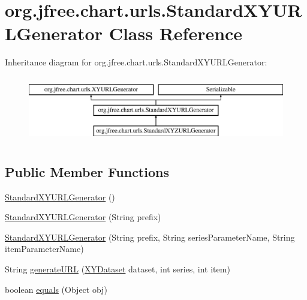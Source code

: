 \hypertarget{classorg_1_1jfree_1_1chart_1_1urls_1_1_standard_x_y_u_r_l_generator}{}\section{org.\+jfree.\+chart.\+urls.\+Standard\+X\+Y\+U\+R\+L\+Generator Class Reference}
\label{classorg_1_1jfree_1_1chart_1_1urls_1_1_standard_x_y_u_r_l_generator}
Inheritance diagram for org.\+jfree.\+chart.\+urls.\+Standard\+X\+Y\+U\+R\+L\+Generator\+:\begin{figure}[H]
\begin{center}
\leavevmode
\includegraphics[height=2.906574cm]{classorg_1_1jfree_1_1chart_1_1urls_1_1_standard_x_y_u_r_l_generator}
\end{center}
\end{figure}
\subsection*{Public Member Functions}
\begin{DoxyCompactItemize}
\item 
\mbox{\hyperlink{classorg_1_1jfree_1_1chart_1_1urls_1_1_standard_x_y_u_r_l_generator_a425eb3dcb8d8391f50638ed1cb5edd79}{Standard\+X\+Y\+U\+R\+L\+Generator}} ()
\item 
\mbox{\hyperlink{classorg_1_1jfree_1_1chart_1_1urls_1_1_standard_x_y_u_r_l_generator_a8dfdae933d8c44f59e55aeaeb650091f}{Standard\+X\+Y\+U\+R\+L\+Generator}} (String prefix)
\item 
\mbox{\hyperlink{classorg_1_1jfree_1_1chart_1_1urls_1_1_standard_x_y_u_r_l_generator_aabfc47d4adf05c373063da6091a90274}{Standard\+X\+Y\+U\+R\+L\+Generator}} (String prefix, String series\+Parameter\+Name, String item\+Parameter\+Name)
\item 
String \mbox{\hyperlink{classorg_1_1jfree_1_1chart_1_1urls_1_1_standard_x_y_u_r_l_generator_afdbbde5516c0cdc59116103b1f4ad62d}{generate\+U\+RL}} (\mbox{\hyperlink{interfaceorg_1_1jfree_1_1data_1_1xy_1_1_x_y_dataset}{X\+Y\+Dataset}} dataset, int series, int item)
\item 
boolean \mbox{\hyperlink{classorg_1_1jfree_1_1chart_1_1urls_1_1_standard_x_y_u_r_l_generator_aa126c4cd9885039e1e49dbae4ef660d8}{equals}} (Object obj)
\end{DoxyCompactItemize}

